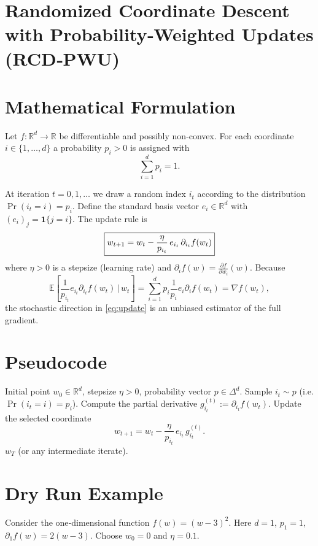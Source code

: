 \documentclass{article}
\newcommand{\E}{\mathbb{E}}
\newcommand{\R}{\mathbb{R}}
\begin{document}
\section*{Randomized Coordinate Descent with Probability‑Weighted Updates (RCD‑PWU)}

\section*{Mathematical Formulation}
Let $f:\R^{d}\rightarrow\R$ be differentiable and possibly non‑convex.  
For each coordinate $i\in\{1,\dots,d\}$ a probability $p_i>0$ is assigned with
\[
\sum_{i=1}^{d}p_i=1 .
\]

At iteration $t=0,1,\dots$ we draw a random index $i_t$ according to the distribution
$\Pr(i_t=i)=p_i$.  Define the standard basis vector $e_i\in\R^{d}$ with $(e_i)_j=\mathbf 1\{j=i\}$.
The update rule is
\begin{equation}
\boxed{%
w_{t+1}=w_{t}-\frac{\eta}{p_{i_t}}\,e_{i_t}\,\partial_{i_t}f(w_t)
}\label{eq:update}
\end{equation}
where $\eta>0$ is a stepsize (learning rate) and $\partial_i f(w)=\frac{\partial f}{\partial w_i}(w)$.
Because
\[
\E\!\left[\frac{1}{p_{i_t}}e_{i_t}\partial_{i_t}f(w_t)\,\Big|\,w_t\right]
   =\sum_{i=1}^{d}p_i\frac{1}{p_i}e_i\partial_i f(w_t)=\nabla f(w_t),
\]
the stochastic direction in \eqref{eq:update} is an unbiased estimator of the full gradient.

\section*{Pseudocode}
\begin{algorithm}[H]
\caption{RCD‑PWU}
\begin{algorithmic}[1]
\REQUIRE Initial point $w_0\in\R^{d}$, stepsize $\eta>0$, probability vector $p\in\Delta^{d}$.
    \STATE Sample $i_t\sim p$ (i.e. $\Pr(i_t=i)=p_i$).
    \STATE Compute the partial derivative $g_{i_t}^{(t)}:=\partial_{i_t}f(w_t)$.
    \STATE Update the selected coordinate
    \[
        w_{t+1}=w_{t}-\frac{\eta}{p_{i_t}}\,e_{i_t}\,g_{i_t}^{(t)} .
    \]
\ENDFOR
\RETURN $w_T$ (or any intermediate iterate).
\end{algorithmic}
\end{algorithm}

\section*{Dry Run Example}
Consider the one‑dimensional function $f(w)=(w-3)^2$.
Here $d=1$, $p_1=1$, $\partial_1 f(w)=2(w-3)$.
Choose $w_0=0$ and $\eta=0.1$.
\end{document}
